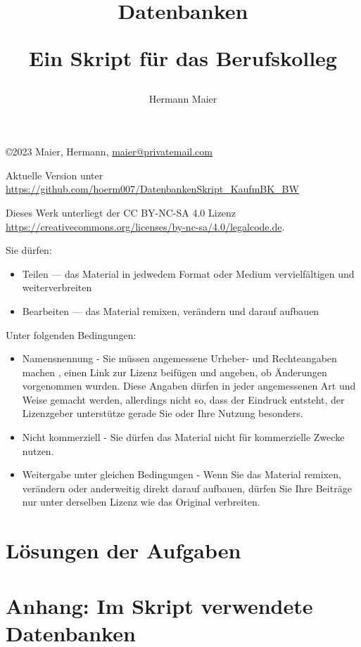 \documentclass[a4paper,12pt, headsepline, ngerman]{scrartcl}
\begin{document}
	\setlength\parindent{0pt} %

	\rohead{}
	\cofoot[\pagemark]{\pagemark}
	\title{Datenbanken

	Ein Skript für das Berufskolleg}
	\author{Hermann Maier}
	\maketitle
	\thispagestyle{empty}
	\newpage
	\null\vfill
	\copyright 2023 Maier, Hermann, \href{mailto:maier@privatemail.com}{maier@privatemail.com}

    Aktuelle Version unter \href{https://github.com/hoerm007/DatenbankenSkript_KaufmBK_BW}{https://github.com/hoerm007/DatenbankenSkript\_KaufmBK\_BW}

	Dieses Werk unterliegt der CC BY-NC-SA 4.0 Lizenz \href{https://creativecommons.org/licenses/by-nc-sa/4.0/legalcode.de}{https://creativecommons.org/licenses/by-nc-sa/4.0/legalcode.de}.

	Sie dürfen:
	\begin{itemize}
		\item Teilen — das Material in jedwedem Format oder Medium vervielfältigen und weiterverbreiten
		\item Bearbeiten — das Material remixen, verändern und darauf aufbauen
	\end{itemize}
	Unter folgenden Bedingungen:
	\begin{itemize}
		\item Namensnennung - Sie müssen angemessene Urheber- und Rechteangaben machen , einen Link zur Lizenz beifügen und angeben, ob Änderungen vorgenommen wurden. Diese Angaben dürfen in jeder angemessenen Art und Weise gemacht werden, allerdings nicht so, dass der Eindruck entsteht, der Lizenzgeber unterstütze gerade Sie oder Ihre Nutzung besonders.
		\item Nicht kommerziell - Sie dürfen das Material nicht für kommerzielle Zwecke nutzen.
		\item Weitergabe unter gleichen Bedingungen - Wenn Sie das Material remixen, verändern oder anderweitig direkt darauf aufbauen, dürfen Sie Ihre Beiträge nur unter derselben Lizenz wie das Original verbreiten.
	\end{itemize}
	\newpage
	\tableofcontents
	\thispagestyle{empty}
	\newpage
	\def\pics{./pics}
	
	\newpage
	
	\newpage
	
	\newpage
	
	\newpage
	
	\newpage
	
	\newpage
	
	\newpage
	
	\newpage
	
	\newpage
	
	\newpage
	
	
	\newpage
	
	\newpage
	
    \newpage
    \section{Lösungen der Aufgaben}
    \shipoutAnswer
    \newpage
    \section{Anhang: Im Skript verwendete Datenbanken}
    
\end{document}
